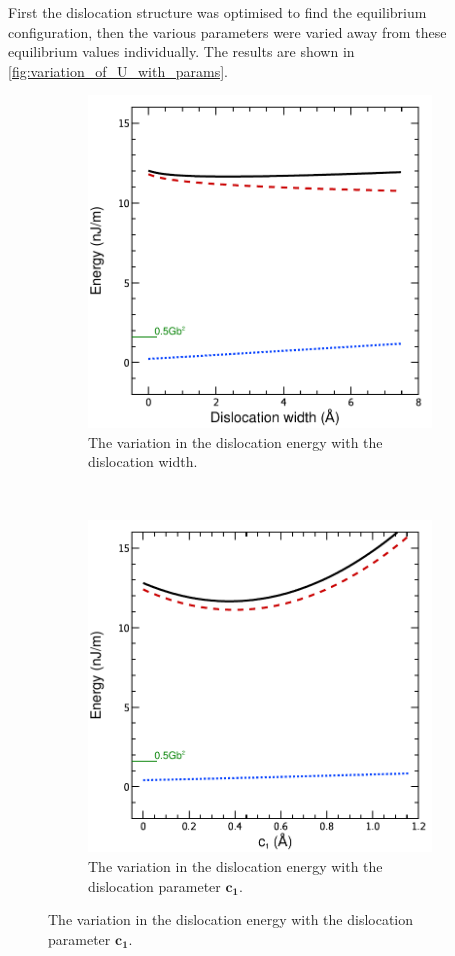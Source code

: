 First the dislocation structure was optimised to find the equilibrium configuration, then the  various parameters were varied away from these equilibrium values individually. The results are shown in \autoref{fig:variation_of_U_with_params}. 


\begin{figure}
\centering
\begin{subfigure}{0.4\textwidth}
\centering
\includegraphics[width=\textwidth]{U_vs_w}
\caption{The variation in the dislocation energy with the dislocation width.\label{fig:U_vs_w}}
\end{subfigure}
~
\begin{subfigure}{0.4\textwidth}
\centering
\includegraphics[width=\textwidth]{U_vs_c1}
\caption{The variation in the dislocation energy with the dislocation parameter $\mathbf{c_1}$.}
\end{subfigure}


\end{figure}
